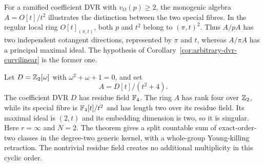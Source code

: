 \begin{remark}
For a ramified coefficient DVR with $v_O(p)\geq2$, the monogenic
algebra $A=O[t]/t^2$ illustrates the distinction between the two
special fibres.  In the regular local ring $O[t]_{(\pi,t)}$, both
$p$ and $t^2$ belong to $(\pi,t)^2$.  Thus $A/pA$ has two
independent cotangent directions, represented by $\pi$ and $t$,
whereas $A/\pi A$ has a principal maximal ideal.  The hypothesis
of Corollary~\ref{cor:arbitrary-dvr-curvilinear} is the former one.
\end{remark}

\begin{example}\label{ex:curvilinear-residue-field}
Let $D=\mathbb Z_2[\omega]$ with $\omega^2+\omega+1=0$, and set
\[
 A=D[t]/(t^2+4).
\]
The coefficient DVR $D$ has residue field $\mathbb F_4$.  The
ring $A$ has rank four over $\mathbb Z_2$, while its special fibre
is $\mathbb F_4[t]/t^2$ and has length two over its residue field.
Its maximal ideal is $(2,t)$ and its embedding dimension
is two, so it is singular.  Here $r=\infty$ and $N=2$.
The theorem gives a split countable sum of exact-order-two
classes in the degree-two generic kernel, with a
whole-group Young-killing retraction.  The nontrivial
residue field creates no additional multiplicity in this
cyclic order.
\end{example}
